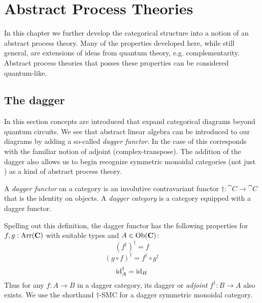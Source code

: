 \chapter{Abstract Process Theories}
\label{chap:cqm}

\todo{\chapabstract{}}

In this chapter we further develop the categorical structure into a notion of an abstract process theory. Many of the properties developed here, while still general, are extensions of ideas from quantum theory, e.g. complementarity.  Abstract process theories that posses these properties can be considered quantum-like.

\section{The dagger}
In this section concepts are introduced that expand categorical diagrams beyond quantum circuits. We see that abstract linear algebra can be introduced to our diagrams by adding a so-called \emph{dagger functor}.  In the case of  this corresponds with the familiar notion of adjoint (complex-transpose).  The addition of the dagger also allows us to begin recognize symmetric monoidal categories (not just ) as a kind of abstract process theory. 

\begin{defn}
\label{defn:dagger}
A \emph{dagger functor} on a category  is an involutive contravariant functor $\dagger:\cat{C}\to\cat{C}$ that is the identity on objects. A \emph{dagger category} is a category equipped with a dagger functor.
\end{defn}
Spelling out this definition, the dagger functor has the following properties for $f,g:\mbox{Arr}(\mathbf{C})$ with suitable types and $A\in\mbox{Ob}(\mathbf{C})$:
\begin{equation}
\left(f^{\dagger}\right)^{\dagger} = f 
\end{equation}
\begin{equation}
(g\circ f)^{\dagger} = f^{\dagger}\circ g^{\dagger}
\end{equation}
\begin{equation}
\mbox{id}_{A}^{\dagger} = \mbox{id}_{H}
\end{equation}
Thus for any $f:A\to B$ in a dagger category, its dagger or \emph{adjoint} $f^{\dagger}:B\to A$ also exists. We use the shorthand $\dagger$-SMC for a dagger symmetric monoidal category.

